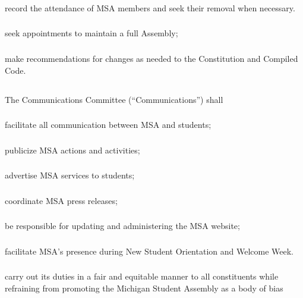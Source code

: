 \subsubsection{}
record the attendance of MSA members and seek their removal when necessary.
\subsubsection{}
seek appointments to maintain a full Assembly;
\subsubsection{}
make recommendations for changes as needed to the Constitution and Compiled Code.


\subsection{}
The Communications Committee (``Communications'') shall
\subsubsection{}
facilitate all communication between MSA and students;
\subsubsection{}
publicize MSA actions and activities;
\subsubsection{}
advertise MSA services to students;
\subsubsection{}
coordinate MSA press releases;
\subsubsection{}
be responsible for updating and administering the MSA website;
\subsubsection{}
facilitate MSA's presence during New Student Orientation and Welcome Week.
\subsubsection{}
carry out its duties in a fair and equitable manner to all constituents while refraining from promoting the Michigan Student Assembly as a body of bias


